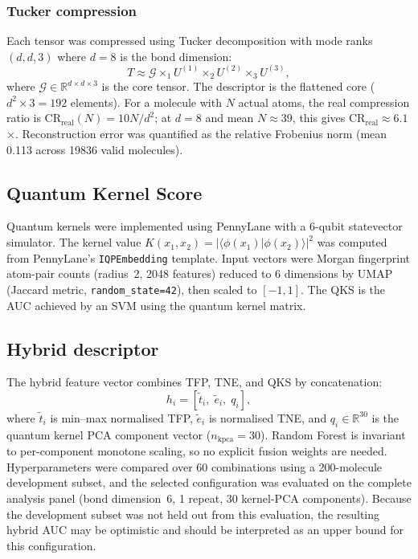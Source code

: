 \documentclass[11pt,a4paper]{article}
\begin{document}
\subsubsection{Tucker compression}

Each tensor was compressed using Tucker decomposition \citep{tensorly_2019} with mode ranks $(d, d, 3)$ where $d = 8$ is the bond dimension:
\begin{equation}
T \approx \mathcal{G} \times_1 U^{(1)} \times_2 U^{(2)} \times_3 U^{(3)},
\end{equation}
where $\mathcal{G} \in \mathbb{R}^{d \times d \times 3}$ is the core tensor. The descriptor is the flattened core ($d^2 \times 3 = 192$ elements). For a molecule with $N$ actual atoms, the real compression ratio is $\mathrm{CR}_{\text{real}}(N) = 10N / d^2$; at $d = 8$ and mean $N \approx 39$, this gives $\mathrm{CR}_{\text{real}} \approx \num{6.1}$$\times$. Reconstruction error was quantified as the relative Frobenius norm (mean \num{0.113} across \num{19836} valid molecules).

\subsection{Quantum Kernel Score}

Quantum kernels were implemented using PennyLane \citep{pennylane_2024} with a 6-qubit statevector simulator. The kernel value $K(x_1, x_2) = |\langle \phi(x_1) | \phi(x_2) \rangle|^2$ was computed from PennyLane's \texttt{IQPEmbedding} template. Input vectors were Morgan fingerprint atom-pair counts (radius~2, \num{2048} features) reduced to 6 dimensions by UMAP (Jaccard metric, \texttt{random\_state=42}), then scaled to $[-1, 1]$. The QKS is the AUC achieved by an SVM using the quantum kernel matrix.

\subsection{Hybrid descriptor}

The hybrid feature vector combines TFP, TNE, and QKS by concatenation:
\begin{equation}
h_i = \left[\tilde{t}_i,\; \tilde{e}_i,\; q_i\right],
\end{equation}
where $\tilde{t}_i$ is min--max normalised TFP, $\tilde{e}_i$ is normalised TNE, and $q_i \in \mathbb{R}^{30}$ is the quantum kernel PCA component vector ($n_{\text{kpca}}=30$). Random Forest is invariant to per-component monotone scaling, so no explicit fusion weights are needed. Hyperparameters were compared over 60 combinations using a \num{200}-molecule development subset, and the selected configuration was evaluated on the complete analysis panel (bond dimension~6, \num{1} repeat, \num{30} kernel-PCA components). Because the development subset was not held out from this evaluation, the resulting hybrid AUC may be optimistic and should be interpreted as an upper bound for this configuration.
\end{document}
